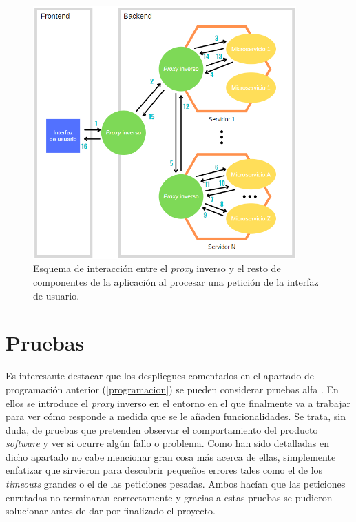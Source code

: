 \documentclass[11pt,spanish,listoffigures]{tfgetsinf}
\begin{document}
\begin{figure}[ht]
\centering
\includegraphics[width=0.9\textwidth]{imagenes/esquemaInteraccionProxyInverso}
\caption{Esquema de interacción entre el \emph{proxy} inverso y el resto de componentes de la aplicación al procesar una petición de la interfaz de usuario.}
	\label{esquemaInteraccionProxyInverso}
\end{figure}


	\section{Pruebas} \label{pruebas}

Es interesante destacar que los despliegues comentados en el apartado de programación anterior (\ref{programacion}) se pueden considerar pruebas alfa \cite{AlphaTest}. En ellos se introduce el \emph{proxy} inverso en el entorno en el que finalmente va a trabajar para ver cómo responde a medida que se le añaden funcionalidades. Se trata, sin duda, de pruebas que pretenden observar el comportamiento del producto \emph{software} y ver si ocurre algún fallo o problema. Como han sido detalladas en dicho apartado no cabe mencionar gran cosa más acerca de ellas, simplemente enfatizar que sirvieron para descubrir pequeños errores tales como el de los \emph{timeouts} grandes o el de las peticiones pesadas. Ambos hacían que las peticiones enrutadas no terminaran correctamente y gracias a estas pruebas se pudieron solucionar antes de dar por finalizado el proyecto.
\end{document}
